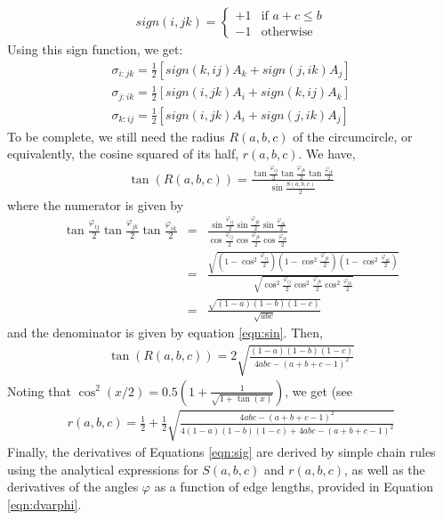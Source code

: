 \documentclass[11 pt]{article}
\theoremstyle{plain} \theorembodyfont{\rmfamily}
\begin{document}
\begin{eqnarray}
sign(i,jk) = \begin{cases}
+1 &\text{if $a+c \le b$}\\
-1 &\text{otherwise}
\end{cases}
\end{eqnarray}
Using this sign function, we get:
\begin{eqnarray}
\sigma_{i:jk} = \frac{1}{2} \left[ sign(k,ij) A_k + sign(j,ik) A_j \right] \nonumber \\
\sigma_{j:ik} = \frac{1}{2} \left[ sign(i,jk) A_i + sign(k,ij) A_k \right] \nonumber \\
\sigma_{k:ij} = \frac{1}{2} \left[ sign(i,jk) A_i + sign(j,ik) A_j \right]
\label{eqn:sig}
\end{eqnarray}
To be complete, we still need the radius $R(a,b,c)$ of the circumcircle, or equivalently, the cosine squared of its half, $r(a,b,c)$. We have,
\begin{eqnarray}
\tan(R(a,b,c)) = \frac{\tan \frac{\varphi_{ij}}{2} \tan \frac{\varphi_{jk}}{2} \tan \frac{\varphi_{ik}}{2}} {\sin \frac{S(a,b,c)}{2}}
\end{eqnarray}
where the numerator is given by
\begin{eqnarray} 
\tan \frac{\varphi_{ij}}{2} \tan \frac{\varphi_{jk}}{2} \tan \frac{\varphi_{ik}}{2} &=& \frac{ \sin \frac{\varphi_{ij}}{2} \sin \frac{\varphi_{jk}}{2} \sin \frac{\varphi_{ik}}{2} }{ \cos \frac{\varphi_{ij}}{2} \cos \frac{\varphi_{jk}}{2} \cos \frac{\varphi_{ik}}{2} } \nonumber \\
&=& \frac{ \sqrt{( 1- \cos^2 \frac{\varphi_{ij}}{2}) ( 1- \cos^2 \frac{\varphi_{jk}}{2}) ( 1- \cos^2 \frac{\varphi_{ik}}{2}) } } {\sqrt{ \cos^2 \frac{\varphi_{ij}}{2} \cos^2 \frac{\varphi_{jk}}{2} \cos^2 \frac{\varphi_{ik}}{2} }}\nonumber \\
&=& \frac{ \sqrt{ (1-a) (1-b) (1-c) }} {\sqrt{ abc }} 
\end{eqnarray}
and the denominator is given by equation \ref{eqn:sin}. Then,
\begin{eqnarray}
\tan(R(a,b,c)) = 2 \sqrt{ \frac{ (1-a) (1-b) (1-c) } {4abc-(a+b+c-1)^2} }
\end{eqnarray}
Noting that $\cos^2(x/2) = 0.5(1 + \frac{1}{\sqrt{1+\tan(x)}})$, we get (see \cite{AkEd19b}
\begin{eqnarray}
r(a,b,c) = \frac{1}{2} + \frac{1}{2} \sqrt{ \frac{ 4abc - (a+b+c-1)^2} { 4(1-a)(1-b)(1-c) + 4abc - (a+b+c-1)^2}}
\end{eqnarray}
Finally, the derivatives of Equations \ref{eqn:sig} are derived by simple chain rules using the analytical expressions for $S(a,b,c)$ and $r(a,b,c)$, as well as the derivatives of the angles $\varphi$ as a function of edge lengths, provided in Equation \ref{eqn:dvarphi}.
\newpage
\end{document}
